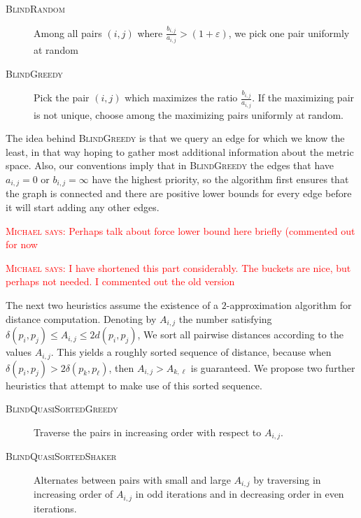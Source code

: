 \documentclass[a4paper,USenglish]{socg-lipics-v2018}
\newcommand{\eps}{\varepsilon}
\newcommand{\dist}{\delta}
\def\marrow{\marginpar[\hfill$\longrightarrow$]{$\longleftarrow$}}
\def\michael#1{\textcolor{red}{\textsc{Michael says: }{\marrow\sf #1}}}
\begin{document}
\begin{description}
\item[\textsc{BlindRandom}] Among all pairs $(i,j)$ where $\frac{b_{i,j}}{a_{i,j}}>(1+\eps)$,
we pick one pair uniformly at random
\item[\textsc{BlindGreedy}] Pick the pair $(i,j)$ which maximizes the ratio $\frac{b_{i,j}}{a_{i,j}}$.
If the maximizing pair is not unique, choose among the maximizing pairs uniformly at random.
\end{description}
%
The idea behind \textsc{BlindGreedy} is that we query an edge for which we know the least,
in that way hoping to gather most additional information about the metric space.
Also, our conventions imply that in \textsc{BlindGreedy} the edges that have $a_{i,j} = 0$ or $b_{i,j} = \infty$
have the highest priority, so the algorithm first ensures that the graph is connected and there are positive
lower bounds for every edge before it will start adding any other edges.

\michael{Perhaps talk about force lower bound here briefly (commented out for now}

\michael{I have shortened this part considerably. The buckets are nice, but perhaps not needed.
I commented out the old version}

The next two heuristics assume the existence of a $2$-approximation algorithm for distance
computation. Denoting by $A_{i,j}$ the number satisfying $\dist(p_i,p_j)\leq A_{i,j}\leq 2 d(p_i,p_j)$,
We sort all pairwise distances according to the values $A_{i,j}$.
This yields a roughly sorted sequence of distance, because when $\dist(p_i,p_j)>2\dist(p_k,p_\ell)$,
then $A_{i,j}>A_{k,\ell}$ is guaranteed.
We propose two further heuristics that attempt to make use of this sorted sequence.
\begin{description}
\item [\textsc{BlindQuasiSortedGreedy}] Traverse the pairs in increasing order with respect to $A_{i,j}$.
\item [\textsc{BlindQuasiSortedShaker}] Alternates between pairs with small and large $A_{i,j}$
by traversing in increasing order of $A_{i,j}$ in odd iterations and in decreasing order
in even iterations.
\end{description}
\end{document}
